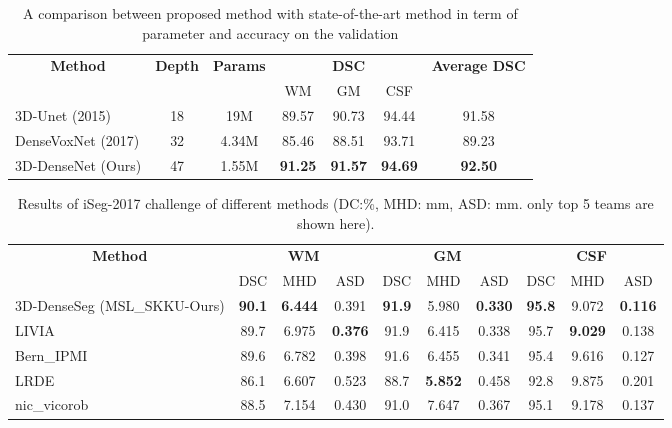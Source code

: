 \documentclass{llncs}
\begin{document}
\begin{table}[!t]
\renewcommand{\arraystretch}{1.3}
\setcellgapes{3pt}\makegapedcells
\caption{A comparison between proposed method with state-of-the-art method in term of parameter and accuracy on the validation}
\label{table_compare}
\centering
\begin{tabular}{l|c|c|c|c|c|c}
\hline
\multicolumn{1}{c|}{\multirow{2}{*}{ \bfseries Method}}  & \multicolumn{1}{c|}{\multirow{2}{*}{ \bfseries Depth}} &\multicolumn{1}{c|}{\multirow{2}{*}{ \bfseries Params}} &\multicolumn{3}{c|}{\bfseries DSC} 
&\multicolumn{1}{c}{\multirow{2}{*}{ \bfseries Average DSC}} \\
\cline{4-6}
&&&WM & GM & CSF \\
\hline
3D-Unet (2015)& 18 & 19M&89.57&90.73&94.44&91.58 \\ 
DenseVoxNet (2017)& 32 & 4.34M &85.46&88.51& 93.71&89.23 \\  
3D-DenseNet (Ours) & 47 & 1.55M &\textbf{91.25} & \textbf{91.57} & \textbf{94.69}& \textbf{92.50}  \\  
\hline
\end{tabular}    
\end{table}
\begin{table*}[!t]
\renewcommand{\arraystretch}{1.3}
\setcellgapes{3pt}\makegapedcells
\caption{Results of iSeg-2017 challenge of different methods (DC:\%, MHD: mm,
ASD: mm. only top 5 teams are shown here).}
\label{table_test}
\centering
\begin{tabular}{l|c|c|c|c|c|c|c|c|c}
\hline
\multicolumn{1}{c|}{\multirow{2}{*}{ \bfseries Method}}  & \multicolumn{3}{c|}{\bfseries WM} &\multicolumn{3}{c|}{\bfseries GM} &\multicolumn{3}{c}{\bfseries CSF} \\
\cline{2-10}
&DSC & MHD & ASD &DSC & MHD & ASD &DSC & MHD & ASD\\
\hline
3D-DenseSeg (MSL\_SKKU-Ours) &\textbf{90.1}&    \textbf{6.444}    &0.391&        \textbf{91.9}&    5.980&    \textbf{0.330}&    \textbf{    95.8}&    9.072&    \textbf{0.116}\\  
LIVIA &89.7    &6.975&    \textbf{0.376}&        91.9    &6.415&    0.338&        95.7&    \textbf{9.029}&    0.138  \\  
Bern\_IPMI & 89.6    &6.782&    0.398&    91.6&    6.455&    0.341&    95.4&    9.616&    0.127  \\  
LRDE&86.1&    6.607&    0.523&        88.7&    \textbf{5.852}&    0.458    &    92.8    &9.875&    0.201\\

nic\_vicorob&88.5    &7.154    &0.430    &    91.0&    7.647    &0.367        &95.1    &9.178    &0.137\\
\hline
\end{tabular}    
\end{table*}
\end{document}
